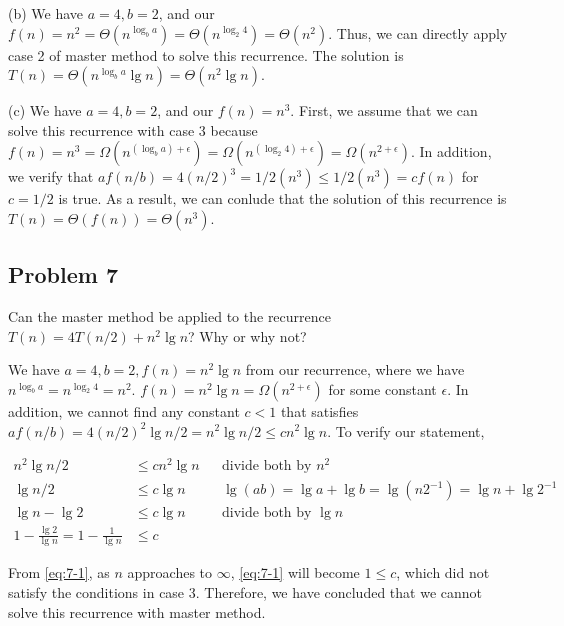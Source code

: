 \documentclass[a4paper]{article}
\makeatletter
\newenvironment{solution}
  {\begin{proof}[Solution]}
  {\end{proof}}
\renewenvironment{proof}[1][\proofname]{%
  \par\pushQED{\qed}\normalfont%
  \topsep6\p@\@plus6\p@\relax
  \trivlist\item[\hskip\labelsep\bfseries#1\@addpunct{.}]%
  \ignorespaces
}{%
  \popQED\endtrivlist\@endpefalse
}
\makeatother
\begin{document}
\begin{solution}
  (b) We have $a = 4, b = 2$, and our $f(n) = n^2 = \Theta(n^{\log_{b}a}) = \Theta(n^{\log_{2}4}) = \Theta(n^2)$. Thus, we can directly apply case 2 of master method to solve this recurrence. The solution is $T(n) = \Theta(n^{\log_{b}a}\lg n) = \Theta(n^2\lg n)$.
\end{solution}

\begin{solution}
  (c) We have $a = 4, b = 2$, and our $f(n) = n^3$. First, we assume that we can solve this recurrence with case 3 because $f(n) = n^3 = \Omega(n^{(\log_{b}a) + \epsilon}) = \Omega(n^{(\log_{2}4) + \epsilon}) = \Omega(n^{2 + \epsilon})$. In addition, we verify that $af(n/b) = 4(n/2)^3 = 1/2(n^3) \le 1/2(n^3) = cf(n)$ for $c = 1/2$ is true. As a result, we can conlude that the solution of this recurrence is $T(n) = \Theta(f(n)) = \Theta(n^3)$.
\end{solution}

\subsection*{Problem 7}
Can the master method be applied to the recurrence $T(n)=4T(n/2)+n^2 \lg n$? Why or why not?
\begin{solution}
  We have $a = 4, b = 2, f(n) = n^2\lg n$ from our recurrence, where we have $n^{\log_{b}a} = n^{\log_{2}4} = n^2$. $f(n) = n^2\lg n= \Omega({n^{2 + \epsilon}})$ for some constant $\epsilon$. In addition, we cannot find any constant $c < 1$ that satisfies $af(n/b) = 4(n/2)^2\lg n/2  = n^2\lg n/2 \le cn^2 \lg n$. To verify our statement,

  \begin{align}
    n^2\lg n/2 &\le cn^2 \lg n && \text{divide both by $n^2$}\nonumber\\
    \lg n/2 &\le c\lg n && \lg(ab) = \lg a + \lg b = \lg(n2^{-1}) = \lg n + \lg2^{-1}\nonumber\\
    \lg n - \lg 2 &\le c\lg n && \text{divide both by $\lg n$}\nonumber\\
    1 - \frac{\lg 2}{\lg n} = 1 - \frac{1}{\lg n}&\le c \label{eq:7-1}
  \end{align}

  From \eqref{eq:7-1}, as $n$ approaches to $\infty$, \eqref{eq:7-1} will become $1 \le c$, which did not satisfy the conditions in case 3. Therefore, we have concluded that we cannot solve this recurrence with master method.
\end{solution}
\setcounter{equation}{0}
\end{document}
